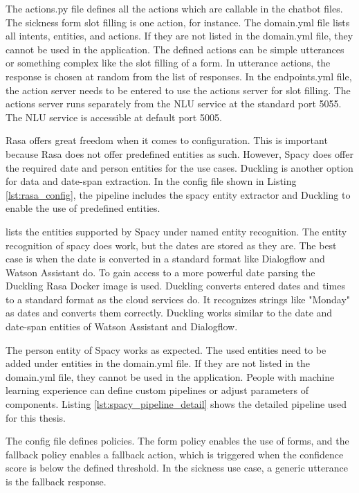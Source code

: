 The actions.py file defines all the actions which are callable in the chatbot files.
The sickness form slot filling is one action, for instance.
The domain.yml file lists all intents, entities, and actions.
If they are not listed in the domain.yml file, they cannot be used in the application.
The defined actions can be simple utterances or something complex like the slot filling of a form.
In utterance actions, the response is chosen at random from the list of responses.
In the endpoints.yml file, the action server needs to be entered to use the actions server for slot filling.
The actions server runs separately from the NLU service at the standard port 5055.
The NLU service is accessible at default port 5005.

Rasa offers great freedom when it comes to configuration.
This is important because Rasa does not offer predefined entities as such.
However, Spacy does offer the required date and person entities for the use cases.
Duckling is another option for data and date-span extraction.
In the config file shown in Listing \ref{lst:rasa_config}, the pipeline includes the spacy entity extractor and Duckling to enable the use of predefined entities.

\citet{spacyapi} lists the entities supported by Spacy under named entity recognition.
The entity recognition of spacy does work, but the dates are stored as they are.
The best case is when the date is converted in a standard format like 
Dialogflow and Watson Assistant do.
To gain access to a more powerful date parsing the Duckling\cite{duckling} Rasa Docker image is used.
Duckling converts entered dates and times to a standard format as the cloud services do.
It recognizes strings like "Monday" as dates and converts them correctly.
Duckling works similar to the date and date-span entities of Watson Assistant and Dialogflow.

The person entity of Spacy works as expected.
The used entities need to be added under entities in the domain.yml file. If they are not listed in the domain.yml file, they cannot be used in the application.
People with machine learning experience can define custom pipelines or adjust parameters of components.
Listing \ref{lst:spacy_pipeline_detail} shows the detailed pipeline used for this thesis.

The config file defines policies.
The form policy enables the use of forms, and the fallback policy enables a fallback action, which is triggered when the confidence score is below the defined threshold. 
In the sickness use case, a generic utterance is the fallback response. 

